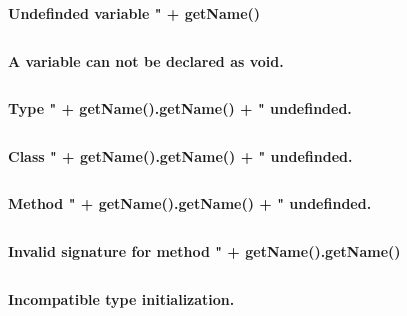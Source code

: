 \documentclass[a4,12pt]{article}
\begin{document}
\textbf{Undefinded variable " + getName()}\\

\begin{lstlisting}

\end{lstlisting}




\textbf{A variable can not be declared as void.}\\

\begin{lstlisting}

\end{lstlisting}




\textbf{Type " + getName().getName() + " undefinded.}\\

\begin{lstlisting}

\end{lstlisting}




\textbf{Class " + getName().getName() + " undefinded.}\\

\begin{lstlisting}

\end{lstlisting}




\textbf{Method " + getName().getName() + " undefinded.}\\

\begin{lstlisting}

\end{lstlisting}




\textbf{Invalid signature for method " + getName().getName()}\\

\begin{lstlisting}

\end{lstlisting}




\textbf{Incompatible type initialization.}\\

\begin{lstlisting}

\end{lstlisting}
\end{document}
